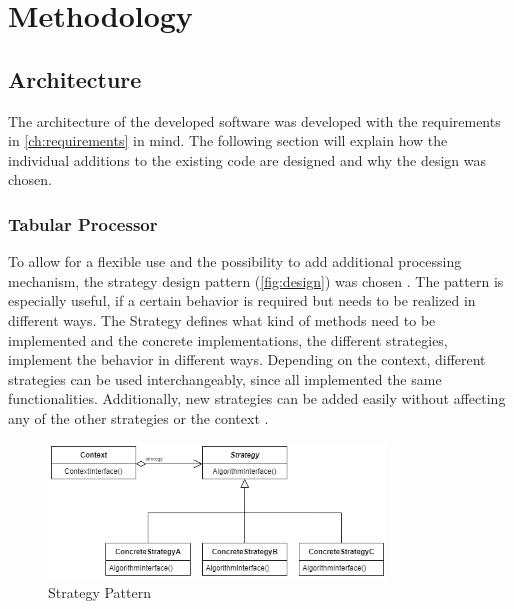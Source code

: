 \chapter{Methodology}
\label{ch:methodology}


\section*{Architecture}
\label{ch:architecture}

The architecture of the developed software was developed with the requirements in \autoref{ch:requirements} in mind.
The following section will explain how the individual additions to the existing code are designed and why the design was chosen.


\subsection[]{Tabular Processor}
\label{ch:architecture-tabularProcessor}

To allow for a flexible use and the possibility to add additional processing mechanism, the strategy design pattern (\autoref{fig:design}) was chosen \cite{gamma1994design}.
The pattern is especially useful, if a certain behavior is required but needs to be realized in different ways.
The Strategy defines what kind of methods need to be implemented and the concrete implementations, the different strategies, implement the behavior in different ways.
Depending on the context, different strategies can be used interchangeably, since all implemented the same functionalities.
Additionally, new strategies can be added easily without affecting any of the other strategies or the context \cite{gamma1994design}.

\begin{figure}[h]
	\centering
	\includegraphics[width=0.8\textwidth]{images/strategy.png}
	\caption{Strategy Pattern \cite[p. 316]{gamma1994design}}
	\label{fig:design}
\end{figure}

